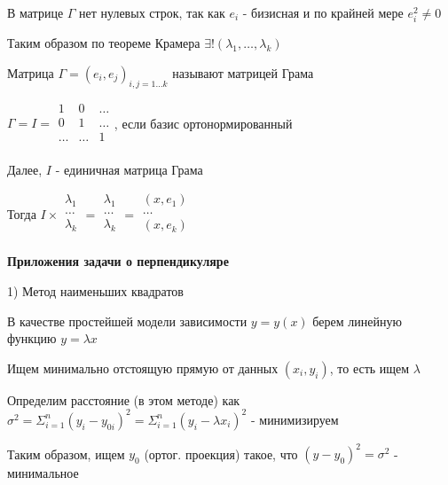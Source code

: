 \documentclass[12pt]{article}
\begin{document}
    \Nota В матрице $\Gamma$ нет нулевых строк, так как $e_i$ - бизисная и по крайней мере $e_i^2 \neq 0$

    Таким образом по теореме Крамера $\exists! (\lambda_1, \dots, \lambda_k)$

    \Def Матрица $\Gamma = {(e_i, e_j)}_{i, j = 1\dots k}$ называют матрицей Грама

    $\Gamma = I = \begin{array}{|ccc|}
    1 & 0 & \ldots\\
    0 & 1 & \ldots\\
    \ldots & \ldots & 1\\
    \end{array}$, если базис ортонормированный

    Далее, $I$ - единичная матрица Грама

    \Nota Тогда $I \times \begin{array}{|c|}
    \lambda_1\\
    \ldots\\
    \lambda_k \\
    \end{array} = \begin{array}{|c|}
    \lambda_1\\
    \ldots\\
    \lambda_k \\
    \end{array} = \begin{array}{|c|}
    (x,e_1)\\
    \ldots\\
    (x,e_k) \\
    \end{array}$

    \vspace{5mm}

    \textbf{Приложения задачи о перпендикуляре}

    1) Метод наименьших квадратов

    В качестве простейшей модели зависимости $y = y(x)$ берем линейную функцию $y = \lambda x$

    Ищем минимально отстоящую прямую от данных $(x_i, y_i)$, то есть ищем $\lambda$

    Определим расстояние (в этом методе) как $\sigma^2 = \Sigma^n_{i=1} (y_i - y_{0i})^2 = \Sigma^n_{i=1} (y_i - \lambda x_i)^2$ - минимизируем

    Таким образом, ищем $y_0$ (ортог. проекция) такое, что $(y - y_0)^2 = \sigma^2$ - минимальное
\end{document}
